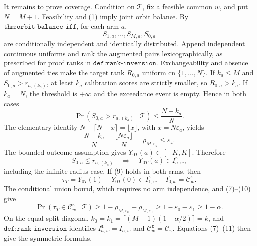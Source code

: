 It remains to prove coverage. Condition on \(\mathcal T\), fix a feasible common \(w\), and put \(N=M+1\). Feasibility and (1) imply joint orbit balance. By \(\texttt{thm:orbit-balance-iff}\), for each arm \(a\),
\[
S_{1,a},\ldots,S_{M,a},S_{0,a}
\tag{6}
\]
are conditionally independent and identically distributed. Append independent continuous uniforms and rank the augmented pairs lexicographically, as prescribed for proof ranks in \(\texttt{def:rank-inversion}\). Exchangeability and absence of augmented ties make the target rank \(R_{0,a}\) uniform on \(\{1,\ldots,N\}\). If \(k_a\le M\) and \(S_{0,a}>r_{a,(k_a)}\), at least \(k_a\) calibration scores are strictly smaller, so \(R_{0,a}>k_a\). If \(k_a=N\), the threshold is \(+\infty\) and the exceedance event is empty. Hence in both cases
\[
\Pr\!\left(S_{0,a}>r_{a,(k_a)}\mid\mathcal T\right)\le\frac{N-k_a}{N}.
\tag{7}
\]
The elementary identity \(N-\lceil N-x\rceil=\lfloor x\rfloor\), with \(x=N\varepsilon_a\), yields
\[
\frac{N-k_a}{N}=\frac{\lfloor N\varepsilon_a\rfloor}{N}=\rho_{M,\varepsilon_a}\le\varepsilon_a.
\tag{8}
\]
The bounded-outcome assumption gives \(Y_{0T}(a)\in[-K,K]\). Therefore
\[
S_{0,a}\le r_{a,(k_a)}\quad\Longrightarrow\quad Y_{0T}(a)\in I^{\boldsymbol\varepsilon}_{a,w},
\tag{9}
\]
including the infinite-radius case. If (9) holds in both arms, then
\[
\tau_T=Y_{0T}(1)-Y_{0T}(0)\in I^{\boldsymbol\varepsilon}_{1,w}-I^{\boldsymbol\varepsilon}_{0,w}=\mathcal C^{\boldsymbol\varepsilon}_w.
\tag{10}
\]
The conditional union bound, which requires no arm independence, and (7)--(10) give
\[
\Pr\!\left(\tau_T\in\mathcal C^{\boldsymbol\varepsilon}_w\mid\mathcal T\right)\ge1-\rho_{M,\varepsilon_0}-\rho_{M,\varepsilon_1}\ge1-\varepsilon_0-\varepsilon_1\ge1-\alpha.
\tag{11}
\]
On the equal-split diagonal, \(k_0=k_1=\lceil(M+1)(1-\alpha/2)\rceil=k\), and \(\texttt{def:rank-inversion}\) identifies \(I^{\boldsymbol\varepsilon}_{a,w}=I_{a,w}\) and \(\mathcal C^{\boldsymbol\varepsilon}_w=\mathcal C_w\). Equations (7)--(11) then give the symmetric formulas.